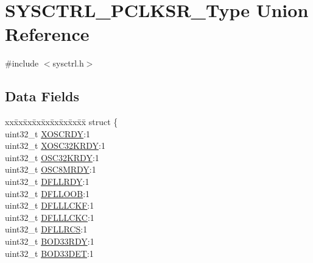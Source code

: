 \hypertarget{union_s_y_s_c_t_r_l___p_c_l_k_s_r___type}{}\section{S\+Y\+S\+C\+T\+R\+L\+\_\+\+P\+C\+L\+K\+S\+R\+\_\+\+Type Union Reference}
\label{union_s_y_s_c_t_r_l___p_c_l_k_s_r___type}


{\ttfamily \#include $<$sysctrl.\+h$>$}

\subsection*{Data Fields}
\begin{DoxyCompactItemize}
\item 
\begin{tabbing}
xx\=xx\=xx\=xx\=xx\=xx\=xx\=xx\=xx\=\kill
struct \{\\
\>uint32\_t \mbox{\hyperlink{union_s_y_s_c_t_r_l___p_c_l_k_s_r___type_ae3f4eaf046b9b3a9346c0d1d2d91cc06}{XOSCRDY}}:1\\
\>uint32\_t \mbox{\hyperlink{union_s_y_s_c_t_r_l___p_c_l_k_s_r___type_a8afcb31d4b37229559de2f9a205d8224}{XOSC32KRDY}}:1\\
\>uint32\_t \mbox{\hyperlink{union_s_y_s_c_t_r_l___p_c_l_k_s_r___type_ae7c0d69dbd8d57c9a1615479f6cc41e9}{OSC32KRDY}}:1\\
\>uint32\_t \mbox{\hyperlink{union_s_y_s_c_t_r_l___p_c_l_k_s_r___type_a6b0534423bae229796a1b7e1feef6929}{OSC8MRDY}}:1\\
\>uint32\_t \mbox{\hyperlink{union_s_y_s_c_t_r_l___p_c_l_k_s_r___type_a1edb42763dec361d286d7a22da8ac910}{DFLLRDY}}:1\\
\>uint32\_t \mbox{\hyperlink{union_s_y_s_c_t_r_l___p_c_l_k_s_r___type_a3a50f59df66d1c38f7bf4c0aa8c56efc}{DFLLOOB}}:1\\
\>uint32\_t \mbox{\hyperlink{union_s_y_s_c_t_r_l___p_c_l_k_s_r___type_aae17a5d3e587fb971abc5106079e77d0}{DFLLLCKF}}:1\\
\>uint32\_t \mbox{\hyperlink{union_s_y_s_c_t_r_l___p_c_l_k_s_r___type_ae19af414b302aae88bdb5c7bb986dd96}{DFLLLCKC}}:1\\
\>uint32\_t \mbox{\hyperlink{union_s_y_s_c_t_r_l___p_c_l_k_s_r___type_a4077d6d7cf1d872f4539d5d606472ab6}{DFLLRCS}}:1\\
\>uint32\_t \mbox{\hyperlink{union_s_y_s_c_t_r_l___p_c_l_k_s_r___type_a301491f5356d64c6590f374e8a876861}{BOD33RDY}}:1\\
\>uint32\_t \mbox{\hyperlink{union_s_y_s_c_t_r_l___p_c_l_k_s_r___type_afe0d01af66ae30fcd7f3c61067b2bef1}{BOD33DET}}:1\\

\end{tabbing}
\end{DoxyCompactItemize}
